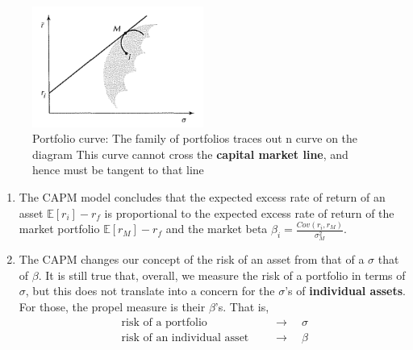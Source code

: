 \documentclass[13pt]{article}
\theoremstyle{definition}
\theoremstyle{remark}
\newenvironment{remark}
  {\pushQED{\qed}\renewcommand{\qedsymbol}{$\triangle$}\remarkx}
  {\popQED\endremarkx}
\newcommand{\EE}{\mathbb{E}}
\begin{document}
\begin{figure}[!htp]
    \centering
    \includegraphics[width=0.5\textwidth]{capm proof.png}
    \caption{Portfolio curve: The family of portfolios traces out n curve on the diagram This curve cannot cross the \textbf{capital market line}, and hence must be tangent to that line}
    \label{fig:capm proof}
\end{figure}

\begin{remark}\hfill
    \begin{enumerate}
        \item The CAPM model concludes that the expected excess rate of return of an asset $\EE[r_i]-r_f$ is proportional to the expected excess rate of return of the market portfolio $\EE[r_M]-r_{f}$ and the market beta $\beta_i=\frac{Cov\left(r_{i}, r_{M}\right)}{\sigma_{M}^{2}}$.
        \item The CAPM changes our concept of the risk of an asset from that of a $\sigma$ that of $\beta$. It is still true that, overall, we measure the risk of a portfolio in terms of $\sigma$, but this does not translate into a concern for the $\sigma$'s of \textbf{individual assets}. For those, the propel measure is their $\beta$'s. That is,
        \begin{align*}
            \text{ risk of a portfolio  }\quad &\longrightarrow \quad \sigma\\
            \text{ risk of an individual asset  }\quad &\longrightarrow \quad \beta
        \end{align*}
    \end{enumerate}
\end{remark}
\end{document}
